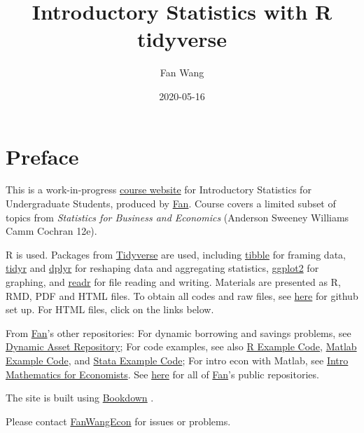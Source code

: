\documentclass[
]{book}
\title{Introductory Statistics with R tidyverse}
\author{Fan Wang}
\date{2020-05-16}
\begin{document}
\maketitle

{
\hypersetup{linkcolor=}
\setcounter{tocdepth}{1}
\tableofcontents
}
\hypertarget{preface}{%
\chapter*{Preface}\label{preface}}

This is a work-in-progress \href{https://fanwangecon.github.io/Stat4Econ/}{course website} for Introductory Statistics for Undergraduate Students, produced by \href{https://fanwangecon.github.io/}{Fan}. Course covers a limited subset of topics from \emph{Statistics for Business and Economics} (Anderson Sweeney Williams Camm Cochran 12e).

R is used. Packages from \href{https://www.tidyverse.org/}{Tidyverse} \citep{R-tidyverse} are used, including \href{https://tibble.tidyverse.org/}{tibble} \citep{R-tibble} for framing data, \href{https://dplyr.tidyverse.org/}{tidyr} \citep{R-tidyr} and \href{https://dplyr.tidyverse.org/}{dplyr} \citep{R-dplyr} for reshaping data and aggregating statistics, \href{https://ggplot2.tidyverse.org/}{ggplot2} \citep{R-ggplot2} for graphing, and \href{https://readr.tidyverse.org/}{readr} \citep{R-readr} for file reading and writing. Materials are presented as R, RMD, PDF and HTML files. To obtain all codes and raw files, see \href{https://fanwangecon.github.io/Stat4Econ/docs/gitsetup.html}{here} for github set up. For HTML files, click on the links below.

From \href{https://fanwangecon.github.io/}{Fan}'s other repositories: For dynamic borrowing and savings problems, see \href{https://fanwangecon.github.io/CodeDynaAsset/}{Dynamic Asset Repository}; For code examples, see also \href{https://fanwangecon.github.io/R4Econ/}{R Example Code}, \href{https://fanwangecon.github.io/M4Econ/}{Matlab Example Code}, and \href{https://fanwangecon.github.io/Stata4Econ/}{Stata Example Code}; For intro econ with Matlab, see \href{https://fanwangecon.github.io/Math4Econ/}{Intro Mathematics for Economists}. See \href{https://github.com/FanWangEcon}{here} for all of \href{https://fanwangecon.github.io/}{Fan}'s public repositories.

The site is built using \href{https://bookdown.org/}{Bookdown} \citep{R-bookdown}.

Please contact \href{https://fanwangecon.github.io/}{FanWangEcon} for issues or problems.
\end{document}
